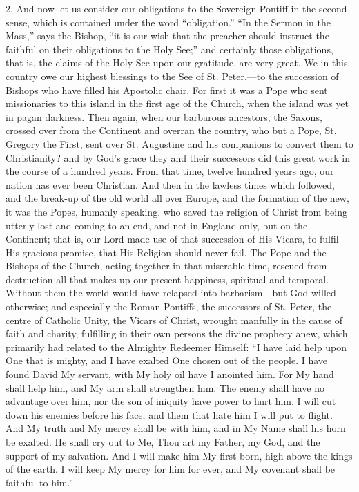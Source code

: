 2. And now let us consider our obligations to the
Sovereign Pontiff in the second sense, which is contained
under the word ``obligation.'' ``In the
Sermon in the Mass,'' says the Bishop, ``it is
our wish that the preacher should instruct the faithful
on their obligations to the Holy See;'' and certainly
those obligations, that is, the claims of the Holy See
upon our gratitude, are very great. We in this country
owe our highest blessings to the See of St.
Peter,—to the succession of Bishops who have filled
his Apostolic chair. For first it was a Pope who sent
missionaries to this island in the first age of the
Church, when the island was yet in pagan darkness. Then
again, when our barbarous ancestors, the Saxons, crossed
over from the Continent and overran the country, who but
a Pope, St. Gregory the First, sent over St. Augustine
and his companions to convert them to Christianity? and
by God's grace they and their successors did this great
work in the course of a hundred years. From that time,
twelve hundred years ago, our nation has ever been
Christian. And then in the lawless times which followed,
and the break-up of the old world all over Europe, and
the formation of the new, it was the Popes, humanly
speaking, who saved the religion of Christ from being
utterly lost and coming to an end, and not in England
only, but on the Continent; that is, our Lord made use of
that succession of His Vicars, to fulfil His gracious
promise, that His Religion should never fail. The Pope
and the Bishops of the Church, acting together in that
miserable time, rescued from destruction all that makes
up our present happiness, spiritual and temporal. Without
them the world would have relapsed into
barbarism—but God willed otherwise; and especially
the Roman Pontiffs, the successors of St. Peter, the
centre of Catholic Unity, the Vicars of Christ, wrought
manfully in the cause of faith and charity, fulfilling in
their own persons the divine prophecy anew, which
primarily had related to the Almighty Redeemer Himself:
``I have laid help upon One that is mighty, and I
have exalted One chosen out of the people. I have found
David My servant, with My holy oil have I anointed him.
For My hand shall help him, and My arm shall strengthen
him. The enemy shall have no advantage over him, nor the
son of iniquity have power to hurt him. I will cut down
his enemies before his face, and them that hate him I
will put to flight. And My truth and My mercy shall be
with him, and in My Name shall his horn be exalted. He
shall cry out to Me, Thou art my Father, my God, and the
support of my salvation. And I will make him My
first-born, high above the kings of the earth. I will
keep My mercy for him for ever, and My covenant shall be
faithful to him.''

